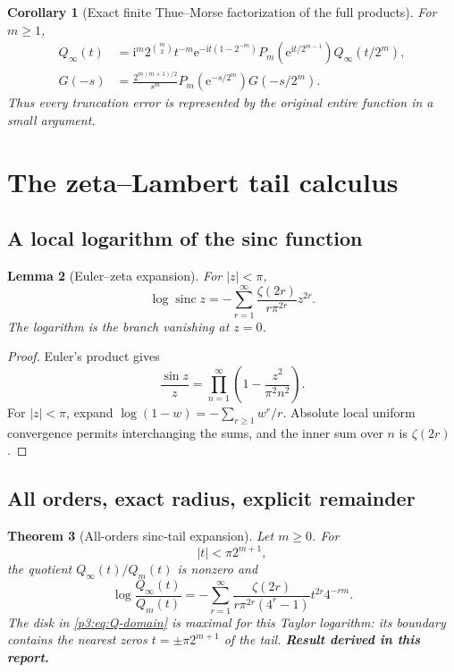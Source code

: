 \documentclass[11pt,oneside]{article}
\numberwithin{equation}{section}
\newtheorem{theorem}{Theorem}[section]
\newtheorem{lemma}[theorem]{Lemma}
\newtheorem{corollary}[theorem]{Corollary}
\theoremstyle{definition}
\theoremstyle{remark}
\newcommand{\sinc}{\operatorname{sinc}}
\newcommand{\e}{\mathrm e}
\newcommand{\ii}{\mathrm i}
\newcommand{\newresult}{\textbf{Result derived in this report.}}
\begin{document}
\begin{corollary}[Exact finite Thue--Morse factorization of the full products]
\label{p3:cor:full-TM-factor}
For $m\ge1$,
\begin{align}
 Q_\infty(t)
 &=\ii^m2^{\binom m2}t^{-m}\e^{-\ii t(1-2^{-m})}
   P_m\!\left(\e^{\ii t/2^{m-1}}\right)Q_\infty(t/2^m),
 \label{p3:eq:full-Q-TM}\\
 G(-s)
 &=\frac{2^{m(m+1)/2}}{s^m}
   P_m\!\left(\e^{-s/2^m}\right)G(-s/2^m).
 \label{p3:eq:full-G-TM}
\end{align}
Thus every truncation error is represented by the original entire function in a small
argument.
\end{corollary}

\section{The zeta--Lambert tail calculus}
\label{p3:sec:zeta-tail}

\subsection{A local logarithm of the sinc function}

\begin{lemma}[Euler--zeta expansion]
\label{p3:lem:logsinc}
For $|z|<\pi$,
\begin{equation}
 \boxed{
 \log\sinc z
 =-\sum_{r=1}^{\infty}\frac{\zeta(2r)}{r\pi^{2r}}z^{2r}.}
 \label{p3:eq:logsinc}
\end{equation}
The logarithm is the branch vanishing at $z=0$.
\end{lemma}

\begin{proof}
Euler's product gives
\[
 \frac{\sin z}{z}=\prod_{n=1}^{\infty}
 \left(1-\frac{z^2}{\pi^2n^2}\right).
\]
For $|z|<\pi$, expand $\log(1-w)=-\sum_{r\ge1}w^r/r$.  Absolute local uniform
convergence permits interchanging the sums, and the inner sum over $n$ is $\zeta(2r)$.
\end{proof}

\subsection{All orders, exact radius, explicit remainder}

\begin{theorem}[All-orders sinc-tail expansion]
\label{p3:thm:all-orders-Q}
Let $m\ge0$.  For
\begin{equation}
 |t|<\pi2^{m+1},
 \label{p3:eq:Q-domain}
\end{equation}
the quotient $Q_\infty(t)/Q_m(t)$ is nonzero and
\begin{equation}
 \boxed{
 \log\frac{Q_\infty(t)}{Q_m(t)}
 =-\sum_{r=1}^{\infty}
 \frac{\zeta(2r)}{r\pi^{2r}(4^r-1)}
 t^{2r}4^{-rm}.}
 \label{p3:eq:Q-all-orders}
\end{equation}
The disk in \eqref{p3:eq:Q-domain} is maximal for this Taylor logarithm: its boundary contains
the nearest zeros $t=\pm\pi2^{m+1}$ of the tail.
\newresult
\end{theorem}
\end{document}

